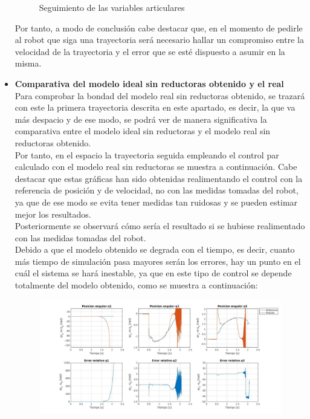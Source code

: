 \begin{itemize}
\begin{figure}[h!]
		\caption{Seguimiento de las variables articulares}
		
	\end{figure}
	
	
	
	Por tanto, a modo de conclusión cabe destacar que, en el momento de pedirle al robot que siga una trayectoria será necesario hallar un compromiso entre la velocidad de la trayectoria y el error que se esté dispuesto a asumir en la misma.\\
	
	
	
	\newpage
	
	\item \textbf{Comparativa del modelo ideal sin reductoras obtenido y el real} \\
	
	Para comprobar la bondad del modelo real sin reductoras obtenido, se trazará con este la primera trayectoria descrita en este apartado, es decir, la que va más despacio y de ese modo, se podrá ver de manera significativa la comparativa entre el modelo ideal sin reductoras y el modelo real sin reductoras obtenido. \\
	
	Por tanto, en el espacio la trayectoria seguida empleando el control par calculado con el modelo real sin reductoras se muestra a continuación. Cabe destacar que estas gráficas han sido obtenidas realimentando el control con la referencia de posición y de velocidad, no con las medidas tomadas del robot, ya que de ese modo se evita tener medidas tan ruidosas y se pueden estimar mejor los resultados.\\
	
	Posteriormente se observará cómo sería el resultado si se hubiese realimentado con las medidas tomadas del robot.\\
	
	
	
	Debido a que el modelo obtenido se degrada con el tiempo, es decir, cuanto más tiempo de simulación pasa mayores serán los errores, hay un punto en el cuál el sistema se hará inestable, ya que en este tipo de control se depende totalmente del modelo obtenido, como se muestra a continuación:
	
	
	
	\begin{figure}[h!]
		
		\centering
		
		\includegraphics[width=.8\textwidth]{exp4_posPDrealSR}
		

\end{figure}
\end{itemize}
